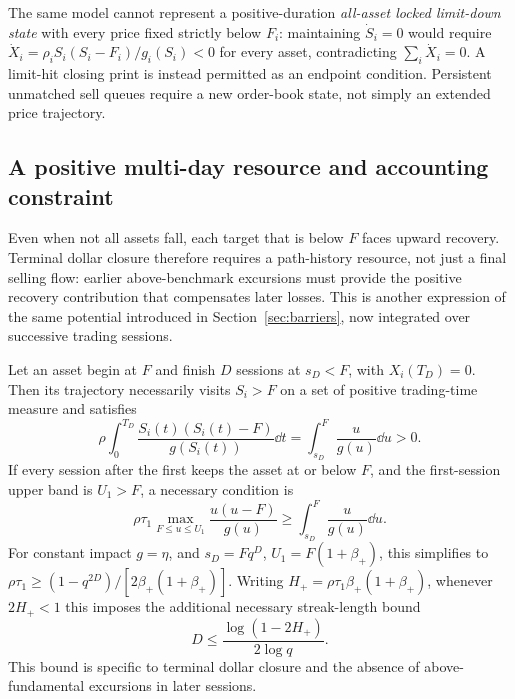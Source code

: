 \documentclass[review,hidelinks,onefignum,onetabnum]{siamonline250211}
\begin{document}
The same model cannot represent a positive-duration \emph{all-asset locked limit-down state} with every price fixed strictly below $F_i$: maintaining $\dot S_i=0$ would require
$\dot X_i=\rho_i S_i(S_i-F_i)/g_i(S_i)<0$ for every asset, contradicting $\sum_i\dot X_i=0$. A limit-hit closing print is instead permitted as an endpoint condition. Persistent unmatched sell queues require a new order-book state, not simply an extended price trajectory.

\subsection{A positive multi-day resource and accounting constraint}\label{subsec:multiday-preconditioning}
Even when not all assets fall, each target that is below $F$ faces upward recovery. Terminal dollar closure therefore requires a path-history resource, not just a final selling flow: earlier above-benchmark excursions must provide the positive recovery contribution that compensates later losses. This is another expression of the same potential introduced in Section~\ref{sec:barriers}, now integrated over successive trading sessions.
\begin{proposition}\label{prop:streak-precondition}
Let an asset begin at $F$ and finish $D$ sessions at $s_D<F$, with $X_i(T_D)=0$. Then its trajectory necessarily visits $S_i>F$ on a set of positive trading-time measure and satisfies
\begin{equation}\label{eq:streak-excursion}
 \rho\int_0^{T_D}\frac{S_i(t)(S_i(t)-F)}{g(S_i(t))}\dd t
 =\int_{s_D}^{F}\frac{u}{g(u)}\dd u>0.
\end{equation}
If every session after the first keeps the asset at or below $F$, and the first-session upper band is $U_1>F$, a necessary condition is
\begin{equation}\label{eq:streak-precondition}
 \quad \rho\tau_1\max_{F\le u\le U_1}\frac{u(u-F)}{g(u)}
 \ge \int_{s_D}^{F}\frac{u}{g(u)}\dd u.\quad
\end{equation}
For constant impact $g=\eta$, and $s_D=Fq^D$, $U_1=F(1+\beta_+)$, this simplifies to
$\rho\tau_1\ge(1-q^{2D})/[2\beta_+(1+\beta_+)]$.
Writing $H_+=\rho\tau_1\beta_+(1+\beta_+)$, whenever $2H_+<1$ this imposes the additional necessary streak-length bound
\begin{equation}\label{eq:multiday-preconditioning-D}
\quad D\le \frac{\log(1-2H_+)}{2\log q}.\quad
\end{equation}
This bound is specific to terminal dollar closure and the absence of above-fundamental excursions in later sessions.
\end{proposition}
\end{document}
